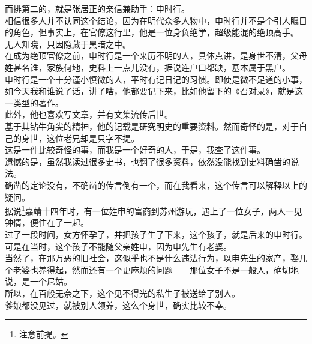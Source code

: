 \begin{multicols}{\theparacolNo}
而排第二的，就是张居正的亲信兼助手：申时行。\\

相信很多人并不认同这个结论，因为在明代众多人物中，申时行并不是个引人瞩目的角色，但事实上，在官僚这行里，他是一位身负绝学，超级能混的绝顶高手。\\

无人知晓，只因隐藏于黑暗之中。\\

在成为绝顶官僚之前，申时行是一个来历不明的人，具体点讲，是身世不清，父母姓甚名谁，家族何地，史料上一点儿没有，据说连户口都缺，基本属于黑户。\\

申时行是一个十分谨小慎微的人，平时有记日记的习惯。即使是微不足道的小事，如今天我和谁说了话，讲了啥，他都要记下来，比如他留下的《召对录》，就是这一类型的著作。\\

此外，他也喜欢写文章，并有文集流传后世。\\

基于其钻牛角尖的精神，他的记载是研究明史的重要资料。然而奇怪的是，对于自己的身世，这位老兄却是只字不提。\\

这是一件比较奇怪的事，而我是一个好奇的人，于是，我查了这件事。\\

遗憾的是，虽然我读过很多史书，也翻了很多资料，依然没能找到史料确凿的说法。\\

确凿的定论没有，不确凿的传言倒有一个，而在我看来，这个传言可以解释以上的疑问。\\

据说\footnote{注意前提。}嘉靖十四年时，有一位姓申的富商到苏州游玩，遇上了一位女子，两人一见钟情，便住在了一起。\\

过了一段时间，女方怀孕了，并把孩子生了下来，这个孩子，就是后来的申时行。\\

可是在当时，这个孩子不能随父亲姓申，因为申先生有老婆。\\

当然了，在那万恶的旧社会，这似乎也不是什么违法行为，以申先生的家产，娶几个老婆也养得起，然而还有一个更麻烦的问题——那位女子不是一般人，确切地说，是一个尼姑。\\

所以，在百般无奈之下，这个见不得光的私生子被送给了别人。\\

爹娘都没见过，就被别人领养，这么个身世，确实比较不幸。\\


\end{multicols}
